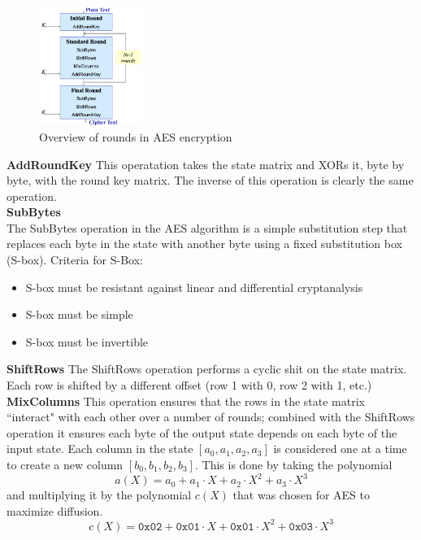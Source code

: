 \begin{figure}[h!]
    \centering
    \includegraphics[width=0.3\textwidth]{img/AES.png}
    \caption{Overview of rounds in AES encryption}
    \label{fig:aes}
\end{figure}

\textbf{AddRoundKey}
This operatation takes the state matrix and XORs it, byte by byte, with the round key matrix. The inverse of this operation is clearly the same operation. \\

\textbf{SubBytes}\\
The SubBytes operation in the AES algorithm is a simple substitution step that replaces each byte in the state with another byte using a fixed substitution box (S-box).
Criteria for S-Box:
\begin{itemize}
    \item S-box must be resistant against linear and differential cryptanalysis
    \item S-box must be simple
    \item S-box must be invertible
\end{itemize}

\textbf{ShiftRows}
The ShiftRows operation performs a cyclic shit on the state matrix. Each row is shifted by a different offset (row 1 with 0, row 2 with 1, etc.) \\

\textbf{MixColumns}
This operation ensures that the rows in the state matrix ``interact" with each other over a number of rounds; combined with the ShiftRows operation it ensures each byte of the output state depends on each byte of the input state.
Each column in the state $[ a_0, a_1, a_2, a_3]$ is considered one at a time to create a new column $[b_0, b_1, b_2, b_3]$. This is done by taking the polynomial
\[ a(X) = a_0 + a_1 \cdot X + a_2 \cdot X^2 + a_3 \cdot X^3 \]
and multiplying it by the polynomial $c(X)$ that was chosen for AES to maximize diffusion.
\[ 
c(X) = \texttt{0x02} + \texttt{0x01} \cdot X + \texttt{0x01}  \cdot X^2 + \texttt{0x03}  \cdot X^3
\]

